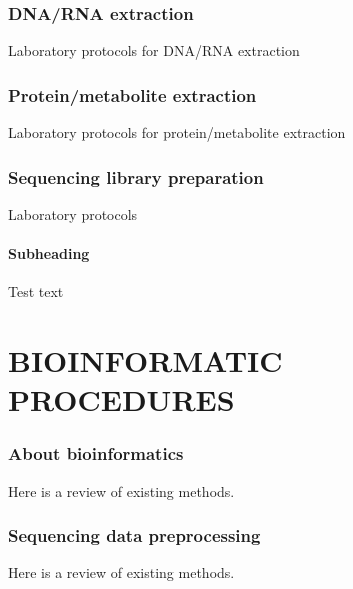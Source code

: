 \documentclass[
]{article}
\begin{document}
\hypertarget{dna-rna-extraction}{%
\section{DNA/RNA extraction}\label{dna-rna-extraction}}

Laboratory protocols for DNA/RNA extraction

\hypertarget{protein-metabolite-extraction}{%
\section{Protein/metabolite extraction}\label{protein-metabolite-extraction}}

Laboratory protocols for protein/metabolite extraction

\hypertarget{sequencing-library-preparation}{%
\section{Sequencing library preparation}\label{sequencing-library-preparation}}

Laboratory protocols

\hypertarget{subheading}{%
\subsection{Subheading}\label{subheading}}

Test text

\hypertarget{part-bioinformatic-procedures}{%
\part{BIOINFORMATIC PROCEDURES}\label{part-bioinformatic-procedures}}

\hypertarget{about-bioinformatics}{%
\section{About bioinformatics}\label{about-bioinformatics}}

Here is a review of existing methods.

\hypertarget{sequencing-data-preprocessing}{%
\section{Sequencing data preprocessing}\label{sequencing-data-preprocessing}}

Here is a review of existing methods.
\end{document}
